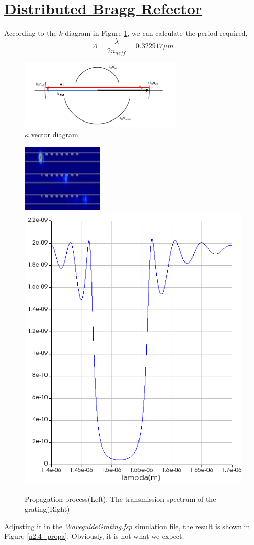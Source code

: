 \documentclass[fontsize=11pt]{scrartcl}
\begin{document}
\section{\uline{Distributed Bragg Refector}}
According to the $k$-diagram in Figure \ref{k-dia-BR}, we can calculate the period required,
\begin{equation}
    \Lambda=\frac\lambda{2n_{neff}}=0.322917\mu m
\end{equation}
\begin{figure}[H]
    \centering
    \includegraphics[width=0.7\textwidth]{img/k-dia-BR.png}
    \caption{$\kappa$ vector diagram}
    \label{k-dia-BR}
\end{figure}
\begin{figure}[H]
    \centering
    \includegraphics[width=0.35\textwidth]{img/n2.4_mov.png}
    \hspace{10mm}
    \includegraphics[height=0.4\textwidth]{img/n2.4_T.png}
    \caption{Propagation process(Left). The transmission spectrum of the grating(Right) }
    \label{n2.4_porpa}
\end{figure}
Adjusting it in the \textit{WaveguideGrating.fsp} simulation file,
the result is shown in Figure \ref{n2.4_propa}. Obviously, it is not what we expect.
\end{document}
